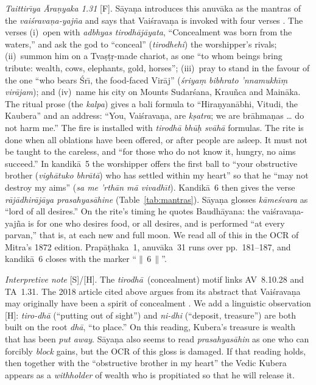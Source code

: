 \documentclass[pdflatex,sn-basic]{sn-jnl}
\theoremstyle{thmstyleone}
\theoremstyle{thmstylethree}
\newcommand{\Fact}{\textsf{[F]}}
\newcommand{\Schol}{\textsf{[S]}}
\newcommand{\Hyp}{\textsf{[H]}}
\begin{document}
\emph{Taittir\=\i ya \=Ara\d nyaka 1.31} \Fact. S\=aya\d na introduces this anuv\=aka as the mantras of the \emph{vai\'srava\d na-yaj\~na} and says that Vai\'srava\d na is invoked with four verses \citep{mitra1872ta}. The verses (i)~open with \emph{adbhyas tirodh\=aj\=ayata}, ``Concealment was born from the waters,'' and ask the god to ``conceal'' (\emph{tirodhehi}) the worshipper's rivals; (ii)~summon him on a Tva\d s\d t\d r-made chariot, as one ``to whom beings bring tribute: wealth, cows, elephants, gold, horses''; (iii)~pray to stand in the favour of the one ``who bears \'Sr\=\i{}, the food-faced Vir\=aj'' (\emph{\'sriya\d m bibhrato 'nnamukh\=\i\d m vir\=ajam}); and (iv)~name his city on Mounts Sudar\'sana, Krau\~nca and Main\=aka. The ritual prose (the \emph{kalpa}) gives a bali formula to ``Hira\d nyan\=abhi, Vitudi, the Kaubera'' and an address: ``You, Vai\'srava\d na, are \emph{k\d satra}; we are br\=ahma\d nas \dots{} do not harm me.'' The fire is installed with \emph{tirodh\=a bh\=u\d h sv\=ah\=a} formulas. The rite is done when all oblations have been offered, or after people are asleep. It must not be taught to the careless, and ``for those who do not know it, hungry, no aims succeed.'' In kandik\=a~5 the worshipper offers the first ball to ``your obstructive brother (\emph{vigh\=atuko bhr\=at\=a}) who has settled within my heart'' so that he ``may not destroy my aims'' (\emph{sa me 'rth\=an m\=a vivadh\=\i t}). Kandik\=a~6 then gives the verse \emph{r\=aj\=adhir\=aj\=aya prasahyas\=ahine} (Table~\ref{tab:mantras}). S\=aya\d na glosses \emph{k\=ame\'svara} as ``lord of all desires.'' On the rite's timing he quotes Baudh\=ayana: the vai\'srava\d na-yaj\~na is for one who desires food, or all desires, and is performed ``at every parvan,'' that is, at each new and full moon. We read all of this in the OCR of Mitra's 1872 edition. Prap\=a\d thaka~1, anuv\=aka~31 runs over pp.~181--187, and kandik\=a~6 closes with the marker ``$\|$\,6\,$\|$''.

\emph{Interpretive note} \Schol/\Hyp. The \emph{tirodh\=a}~(concealment) motif links AV~8.10.28 and TA~1.31. The 2018 article cited above argues from its abstract that Vai\'srava\d na may originally have been a spirit of concealment \citep{joi2018vaisravana}. We add a linguistic observation \Hyp: \emph{tiro-dh\=a} (``putting out of sight'') and \emph{ni-dhi} (``deposit, treasure'') are both built on the root \emph{dh\=a}, ``to place.'' On this reading, Kubera's treasure is wealth that has been \emph{put away}. S\=aya\d na also seems to read \emph{prasahyas\=ahin} as one who can forcibly \emph{block} gains, but the OCR of this gloss is damaged. If that reading holds, then together with the ``obstructive brother in my heart'' the Vedic Kubera appears as a \emph{withholder} of wealth who is propitiated so that he will release it.
\end{document}
